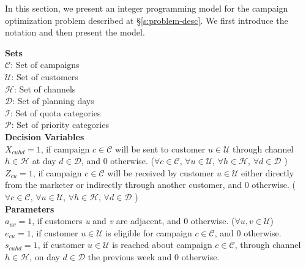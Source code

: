 \documentclass[11pt]{article}
\begin{document}
In this section, we present an integer programming model for the campaign optimization problem described at \S \ref{s:problem-desc}. We first introduce the notation and then present the model.\\
\begin{singlespace}
\noindent \textbf{Sets}\\

\noindent ${\mathcal{C}}$: Set of campaigns \\
\noindent ${\mathcal{U}}$: Set of customers \\
\noindent ${\mathcal{H}}$: Set of channels \\
\noindent ${\mathcal{D}}$: Set of planning days \\
\noindent ${\mathcal{I}}$: Set of quota categories \\
\noindent ${\mathcal{P}}$: Set of priority categories \\


\noindent \textbf{Decision Variables}\\

\noindent $X_{{c}{u}{h}{d}}=1$, if campaign $c \in \mathcal{C}$ will be sent to customer $u \in \mathcal{U}$ through channel $h \in \mathcal{H}$ at day $d \in \mathcal{D}$, and 0 otherwise.
($\forall c \in \mathcal{C}$, $\forall u \in \mathcal{U}$, $\forall h \in \mathcal{H}$, $\forall d \in \mathcal{D}$ )\\

\noindent $Z_{{c}{u}}=1$, if campaign $c \in \mathcal{C}$ will be received by customer $u \in \mathcal{U}$ either directly from the marketer or indirectly through another customer, and 0 otherwise.
($\forall c \in \mathcal{C}$, $\forall u \in \mathcal{U}$, $\forall h \in \mathcal{H}$, $\forall d \in \mathcal{D}$ )\\

\noindent \textbf{Parameters}\\

\noindent $a_{{u}{v}}=1$, if customers \textit{u} and \textit{v} are adjacent, and 0 otherwise.
($\forall u, v \in \mathcal{U}$)\\

\noindent $e_{{c}{u}}=1$, if customer $u \in \mathcal{U}$ is eligible for campaign $c \in \mathcal{C}$, and 0 otherwise.\\

\noindent $s_{{c}{u}{h}{d}}=1$, if customer $u \in \mathcal{U}$ is reached about campaign $c \in \mathcal{C}$, through channel $h \in \mathcal{H}$, on day $d \in \mathcal{D}$ the previous week and 0 otherwise.\\


\end{singlespace}
\end{document}
